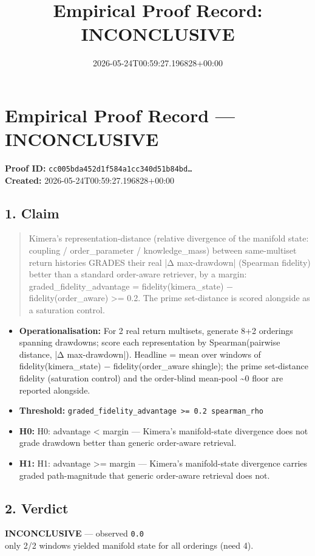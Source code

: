 \documentclass{article}
\title{Empirical Proof Record: INCONCLUSIVE}
\date{2026-05-24T00:59:27.196828+00:00}
\begin{document}
\maketitle
\section*{Empirical Proof Record --- \textcolor{inconclusive}{\textbf{INCONCLUSIVE}}}
\textbf{Proof ID:} \texttt{cc005bda452d1f584a1cc340d51b84bd\dots}\\
\textbf{Created:} 2026-05-24T00:59:27.196828+00:00
\subsection*{1. Claim}
\begin{quote}Kimera's representation-distance (relative divergence of the manifold state: coupling / order\_parameter / knowledge\_mass) between same-multiset return histories GRADES their real |Δ max-drawdown| (Spearman fidelity) better than a standard order-aware retriever, by a margin: graded\_fidelity\_advantage = fidelity(kimera\_state) − fidelity(order\_aware) >= 0.2. The prime set-distance is scored alongside as a saturation control.\end{quote}
\begin{itemize}
\item \textbf{Operationalisation:} For 2 real return multisets, generate 8+2 orderings spanning drawdowns; score each representation by Spearman(pairwise distance, |Δ max-drawdown|). Headline = mean over windows of fidelity(kimera\_state) − fidelity(order\_aware shingle); the prime set-distance fidelity (saturation control) and the order-blind mean-pool \textasciitilde{}0 floor are reported alongside.
\item \textbf{Threshold:} \texttt{graded\_fidelity\_advantage >= 0.2 spearman\_rho}
\item \textbf{H0:} H0: advantage < margin — Kimera's manifold-state divergence does not grade drawdown better than generic order-aware retrieval.
\item \textbf{H1:} H1: advantage >= margin — Kimera's manifold-state divergence carries graded path-magnitude that generic order-aware retrieval does not.
\end{itemize}
\subsection*{2. Verdict}
\textcolor{inconclusive}{\textbf{INCONCLUSIVE}} --- observed \texttt{0.0}\\
only 2/2 windows yielded manifold state for all orderings (need 4).
\end{document}
